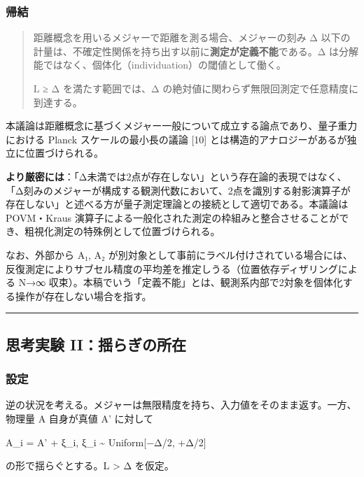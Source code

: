 \documentclass[
  11pt,
]{ltjsarticle}
\begin{document}
\subsubsection{帰結}\label{ux5e30ux7d50}

\begin{quote}
距離概念を用いるメジャーで距離を測る場合、メジャーの刻み Δ
以下の計量は、不確定性関係を持ち出す以前に\textbf{測定が定義不能}である。Δ
は分解能ではなく、個体化（individuation）の閾値として働く。

L ≥ Δ を満たす範囲では、Δ
の絶対値に関わらず無限回測定で任意精度に到達する。
\end{quote}

本議論は距離概念に基づくメジャー一般について成立する論点であり、量子重力における
Planck スケールの最小長の議論 {[}10{]}
とは構造的アナロジーがあるが独立に位置づけられる。

\textbf{より厳密には}：「Δ未満では2点が存在しない」という存在論的表現ではなく、「Δ刻みのメジャーが構成する観測代数において、2点を識別する射影演算子が存在しない」と述べる方が量子測定理論との接続として適切である。本議論は
POVM・Kraus
演算子による一般化された測定の枠組みと整合させることができ、粗視化測定の特殊例として位置づけられる。

なお、外部から A₁, A₂
が別対象として事前にラベル付けされている場合には、反復測定によりサブセル精度の平均差を推定しうる（位置依存ディザリングによる
N→∞
収束）。本稿でいう「定義不能」とは、観測系内部で2対象を個体化する操作が存在しない場合を指す。

\begin{center}\rule{0.5\linewidth}{0.5pt}\end{center}

\subsection{思考実験
II：揺らぎの所在}\label{ux601dux8003ux5b9fux9a13-iiux63faux3089ux304eux306eux6240ux5728}

\subsubsection{設定}\label{ux8a2dux5b9a-1}

逆の状況を考える。メジャーは無限精度を持ち、入力値をそのまま返す。一方、物理量
A 自身が真値 A' に対して

A\_i = A' + ξ\_i, ξ\_i \textasciitilde{} Uniform{[}−Δ/2, +Δ/2{]}

の形で揺らぐとする。L \textgreater{} Δ を仮定。
\end{document}
